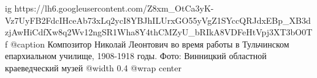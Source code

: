  
 
 
 
 

\ifcmt
	ig https://lh6.googleusercontent.com/Z8xm_OtCa3yK-Vz7UyFB2FdcIHceAb73xLq2ycI8YBJhILUrxGO55yVgZ1SYccQRJdxEBp_XB3dzjAwHiCdfXw8q2Wv12ngSR1Wha8Y4thCMZyU_bRIkA8VDFeHtVpj3XT3bO0Tf
	@caption Композитор Николай Леонтович во время работы в Тульчинском епархиальном училище, 1908-1918 годы. Фото: Винницкий областной краеведческий музей
	@width 0.4
	@wrap center
\fi
